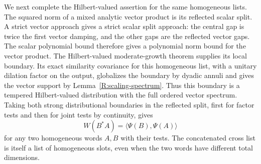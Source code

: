 We next complete the Hilbert-valued assertion for the same homogeneous
lists.  The squared norm of a mixed analytic vector product is its
reflected scalar split.  A strict vector approach gives a strict
scalar split approach: the central gap is twice the first vector
damping, and the other gaps are the reflected vector gaps.  The scalar
polynomial bound therefore gives a polynomial norm bound for the vector
product.  The Hilbert-valued moderate-growth theorem supplies its local
boundary.  Its exact similarity covariance for this homogeneous list,
with a unitary dilation factor on the output, globalizes the boundary
by dyadic annuli and gives the vector support by
Lemma~\ref{R:scaling-spectrum}.  Thus this boundary is a tempered
Hilbert-valued distribution with the full ordered vector spectrum.
Taking both strong distributional boundaries in the reflected split,
first for factor tests and then for joint tests by continuity, gives
\[
 W(B^*A)=\langle\Psi(B),\Psi(A)\rangle
\]
for any two homogeneous words $A,B$ with their tests.  The concatenated
cross list is itself a list of homogeneous slots, even when the two
words have different total dimensions.

